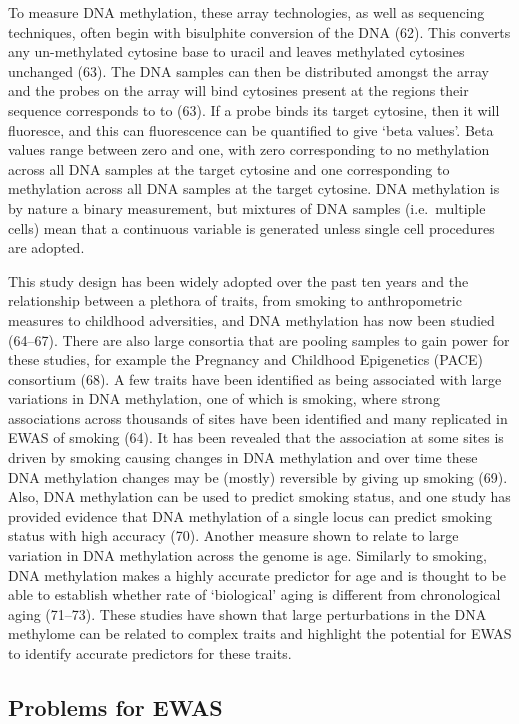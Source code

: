 \documentclass[11pt,oneside]{bristolthesis}
\begin{document}
To measure DNA methylation, these array technologies, as well as sequencing techniques, often begin with bisulphite conversion of the DNA (62). This converts any un-methylated cytosine base to uracil and leaves methylated cytosines unchanged (63). The DNA samples can then be distributed amongst the array and the probes on the array will bind cytosines present at the regions their sequence corresponds to to (63). If a probe binds its target cytosine, then it will fluoresce, and this can fluorescence can be quantified to give `beta values'. Beta values range between zero and one, with zero corresponding to no methylation across all DNA samples at the target cytosine and one corresponding to methylation across all DNA samples at the target cytosine. DNA methylation is by nature a binary measurement, but mixtures of DNA samples (i.e.~multiple cells) mean that a continuous variable is generated unless single cell procedures are adopted.

This study design has been widely adopted over the past ten years and the relationship between a plethora of traits, from smoking to anthropometric measures to childhood adversities, and DNA methylation has now been studied (64--67). There are also large consortia that are pooling samples to gain power for these studies, for example the Pregnancy and Childhood Epigenetics (PACE) consortium (68). A few traits have been identified as being associated with large variations in DNA methylation, one of which is smoking, where strong associations across thousands of sites have been identified and many replicated in EWAS of smoking (64). It has been revealed that the association at some sites is driven by smoking causing changes in DNA methylation and over time these DNA methylation changes may be (mostly) reversible by giving up smoking (69). Also, DNA methylation can be used to predict smoking status, and one study has provided evidence that DNA methylation of a single locus can predict smoking status with high accuracy (70). Another measure shown to relate to large variation in DNA methylation across the genome is age. Similarly to smoking, DNA methylation makes a highly accurate predictor for age and is thought to be able to establish whether rate of `biological' aging is different from chronological aging (71--73). These studies have shown that large perturbations in the DNA methylome can be related to complex traits and highlight the potential for EWAS to identify accurate predictors for these traits.

\hypertarget{problems-for-ewas}{%
\subsection{Problems for EWAS}\label{problems-for-ewas}}
\end{document}
